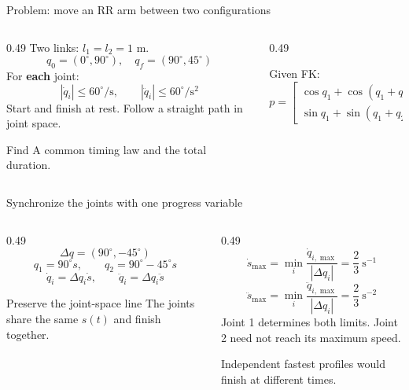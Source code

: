 \documentclass[aspectratio=169]{beamer}
\begin{document}
\begin{frame}[t]{Problem: move an RR arm between two configurations}
    \small
    \begin{columns}[T,onlytextwidth]
        \begin{column}{0.49\textwidth}
            Two links: $l_1=l_2=1$ m.
            \[q_0=(0^\circ,90^\circ),\quad q_f=(90^\circ,45^\circ)\]
            For \textbf{each} joint:
            \[|\dot q_i|\leq60^\circ/\mathrm{s},\qquad |\ddot q_i|\leq60^\circ/\mathrm{s}^2\]
            Start and finish at rest. Follow a straight path in joint space.
            \begin{block}{Find}
                A common timing law and the total duration.
            \end{block}
        \end{column}
        \begin{column}{0.49\textwidth}
            \centering
            \par\raggedright Given FK:
            \[p=\begin{bmatrix}\cos q_1+\cos(q_1+q_2)\\ \sin q_1+\sin(q_1+q_2)\end{bmatrix}\]
        \end{column}
    \end{columns}
\end{frame}

\begin{frame}[t]{Synchronize the joints with one progress variable}
    \small
    \begin{columns}[T,onlytextwidth]
        \begin{column}{0.49\textwidth}
            \[\Delta q=(90^\circ,-45^\circ)\]
            \[q_1=90^\circ s,\qquad q_2=90^\circ-45^\circ s\]
            \[\dot q_i=\Delta q_i\dot s,\qquad \ddot q_i=\Delta q_i\ddot s\]
            \begin{block}{Preserve the joint-space line}
                The joints share the same $s(t)$ and finish together.
            \end{block}
        \end{column}
        \begin{column}{0.49\textwidth}
            \[\dot s_{\max}=\min_i\frac{\dot q_{i,\max}}{|\Delta q_i|}=\frac23\ \mathrm{s}^{-1}\]
            \[\ddot s_{\max}=\min_i\frac{\ddot q_{i,\max}}{|\Delta q_i|}=\frac23\ \mathrm{s}^{-2}\]
            Joint 1 determines both limits. Joint 2 need not reach its maximum speed.
            \medskip

            Independent fastest profiles would finish at different times.
        \end{column}
    \end{columns}
\end{frame}
\end{document}
